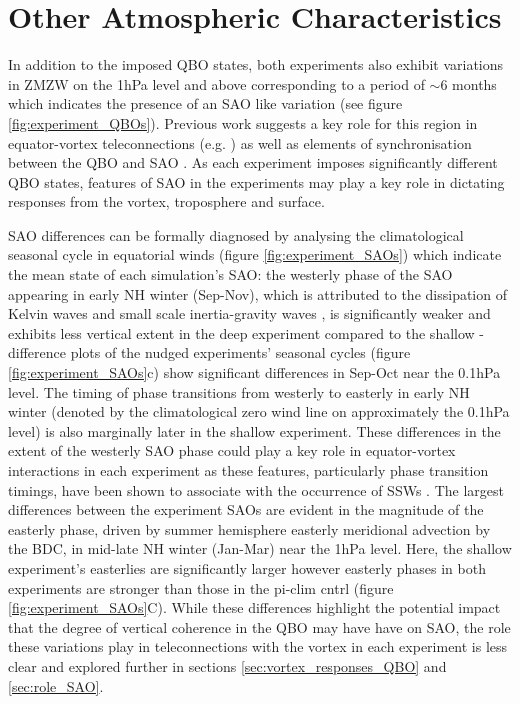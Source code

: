\section{Other Atmospheric Characteristics}

In addition to the imposed QBO states, both experiments also exhibit variations in ZMZW on the 1hPa level and above corresponding to a period of $\sim$6 months which indicates the presence of an SAO like variation (see figure \ref{fig:experiment_QBOs}). Previous work suggests a key role for this region in equator-vortex teleconnections (e.g. \cite{grayForecasting2020a}) as well as elements of synchronisation between the QBO and SAO \citep{kuaiNonstationary2009c}. As each experiment imposes significantly different QBO states, features of SAO in the experiments may play a key role in dictating responses from the vortex, troposphere and surface.

SAO differences can be formally diagnosed by analysing the climatological seasonal cycle in equatorial winds (figure \ref{fig:experiment_SAOs}) which indicate the mean state of each simulation's SAO: the westerly phase of the SAO appearing in early NH winter (Sep-Nov), which is attributed to the dissipation of Kelvin waves and small scale inertia-gravity waves \citep{dunkertonRole1979, hitchmanEstimation1988}, is significantly weaker and exhibits less vertical extent in the deep experiment compared to the shallow - difference plots of the nudged experiments' seasonal cycles (figure \ref{fig:experiment_SAOs}c) show significant differences in Sep-Oct near the 0.1hPa level. The timing of phase transitions from westerly to easterly in early NH winter (denoted by the climatological zero wind line on approximately the 0.1hPa level) is also marginally later in the shallow experiment. These differences in the extent of the westerly SAO phase could play a key role in equator-vortex interactions in each experiment as these features, particularly phase transition timings, have been shown to associate with the occurrence of SSWs \citep{grayData2001, hamiltonEffects1998}. The largest differences between the experiment SAOs are evident in the magnitude of the easterly phase, driven by summer hemisphere easterly meridional advection by the BDC, in mid-late NH winter (Jan-Mar) near the 1hPa level. Here, the shallow experiment's easterlies are significantly larger however easterly phases in both experiments are stronger than those in the pi-clim cntrl (figure \ref{fig:experiment_SAOs}C). While these differences highlight the potential impact that the degree of vertical coherence in the QBO may have have on SAO, the role these variations play in teleconnections with the vortex in each experiment is less clear and explored further in sections \ref{sec:vortex_responses_QBO} and \ref{sec:role_SAO}.

